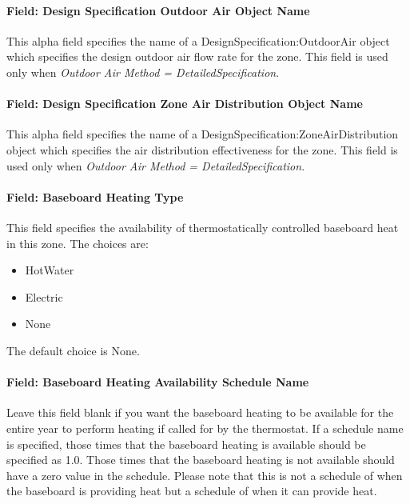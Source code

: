 \paragraph{Field: Design Specification Outdoor Air Object Name}\label{field-design-specification-outdoor-air-object-name-3-000}

This alpha field specifies the name of a DesignSpecification:OutdoorAir object which specifies the design outdoor air flow rate for the zone. This field is used only when \emph{Outdoor Air Method = DetailedSpecification}.

\paragraph{Field: Design Specification Zone Air Distribution Object Name}\label{field-design-specification-zone-air-distribution-object-name-2}

This alpha field specifies the name of a DesignSpecification:ZoneAirDistribution object which specifies the air distribution effectiveness for the zone. This field is used only when \emph{Outdoor Air Method = DetailedSpecification}.

\paragraph{Field: Baseboard Heating Type}\label{field-baseboard-heating-type-2}

This field specifies the availability of thermostatically controlled baseboard heat in this zone. The choices are:

\begin{itemize}
\item
  HotWater
\item
  Electric
\item
  None
\end{itemize}

The default choice is None.

\paragraph{Field: Baseboard Heating Availability Schedule Name}\label{field-baseboard-heating-availability-schedule-name-2}

Leave this field blank if you want the baseboard heating to be available for the entire year to perform heating if called for by the thermostat. If a schedule name is specified, those times that the baseboard heating is available should be specified as 1.0. Those times that the baseboard heating is not available should have a zero value in the schedule. Please note that this is not a schedule of when the baseboard is providing heat but a schedule of when it can provide heat.

